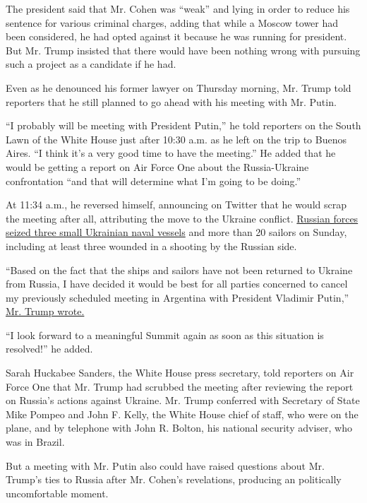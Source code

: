 The president said that Mr. Cohen was ``weak'' and lying in order to
reduce his sentence for various criminal charges, adding that while a
Moscow tower had been considered, he had opted against it because he was
running for president. But Mr. Trump insisted that there would have been
nothing wrong with pursuing such a project as a candidate if he had.

Even as he denounced his former lawyer on Thursday morning, Mr. Trump
told reporters that he still planned to go ahead with his meeting with
Mr. Putin.

``I probably will be meeting with President Putin,'' he told reporters
on the South Lawn of the White House just after 10:30 a.m. as he left on
the trip to Buenos Aires. ``I think it's a very good time to have the
meeting.'' He added that he would be getting a report on Air Force One
about the Russia-Ukraine confrontation ``and that will determine what
I'm going to be doing.''

At 11:34 a.m., he reversed himself, announcing on Twitter that he would
scrap the meeting after all, attributing the move to the Ukraine
conflict.
\href{https://www.nytimes3xbfgragh.onion/2018/11/26/world/europe/russia-ukraine-kerch-strait.html}{Russian
forces seized three small Ukrainian naval vessels} and more than 20
sailors on Sunday, including at least three wounded in a shooting by the
Russian side.

``Based on the fact that the ships and sailors have not been returned to
Ukraine from Russia, I have decided it would be best for all parties
concerned to cancel my previously scheduled meeting in Argentina with
President Vladimir Putin,''
\href{https://twitter.com/realDonaldTrump/status/1068181367857397760}{Mr.
Trump wrote.}

``I look forward to a meaningful Summit again as soon as this situation
is resolved!'' he added.

Sarah Huckabee Sanders, the White House press secretary, told reporters
on Air Force One that Mr. Trump had scrubbed the meeting after reviewing
the report on Russia's actions against Ukraine. Mr. Trump conferred with
Secretary of State Mike Pompeo and John F. Kelly, the White House chief
of staff, who were on the plane, and by telephone with John R. Bolton,
his national security adviser, who was in Brazil.

But a meeting with Mr. Putin also could have raised questions about Mr.
Trump's ties to Russia after Mr. Cohen's revelations, producing an
politically uncomfortable moment.

